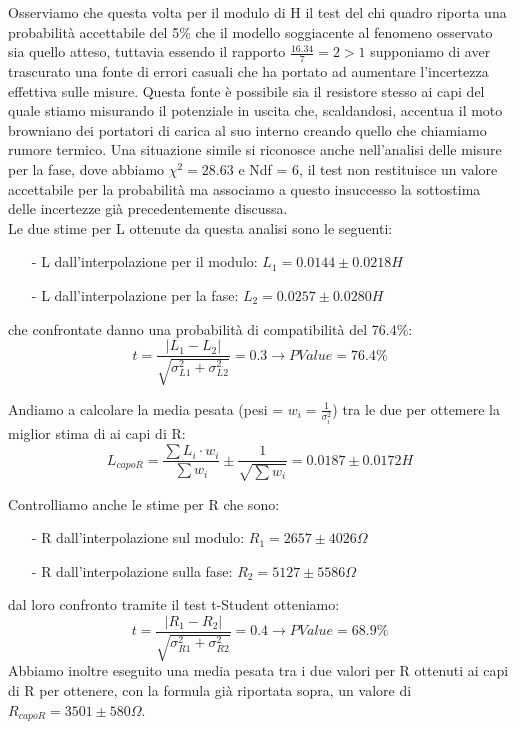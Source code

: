 \documentclass{article}
\theoremstyle{definition}
\begin{document}
\noindent Osserviamo che questa volta per il modulo di H il test del chi quadro riporta una probabilità accettabile del 5\% che il modello soggiacente al fenomeno osservato sia quello atteso, tuttavia essendo il rapporto \(\frac{16.34}{7} = 2 > 1\) supponiamo di aver trascurato una fonte di errori casuali che ha portato ad aumentare l'incertezza effettiva sulle misure. Questa fonte è possibile sia il resistore stesso ai capi del quale stiamo misurando il potenziale in uscita che, scaldandosi, accentua il moto browniano dei portatori di carica al suo interno creando quello che chiamiamo rumore termico. Una situazione simile si riconosce anche nell'analisi delle misure per la fase, dove abbiamo \(\chi^{2} =28.63 \) e Ndf = 6, il test non restituisce un valore accettabile per la probabilità ma associamo a questo insuccesso la sottostima delle incertezze già precedentemente discussa. \\

\noindent Le due stime per L ottenute da questa analisi sono le seguenti:
\begin{enumerate}
    \item[-] L dall'interpolazione per il modulo: \(L_{1} = 0.0144 \pm 0.0218 H\)
    \item[-] L dall'interpolazione per la fase: \(L_{2} = 0.0257 \pm 0.0280 H\)
\end{enumerate}
\noindent che confrontate danno una probabilità di compatibilità del 76.4\%:
\[t = \frac{\left| L_{1} - L_{2}\right|}{\sqrt{\sigma^{2}_{L1} + \sigma^{2}_{L2}}} = 0.3 \rightarrow PValue = 76.4\%\]

\noindent Andiamo a calcolare la media pesata (pesi = \(w_{i} = \frac{1}{\sigma^{2}_{i}}\)) tra le due per ottemere la miglior stima di ai capi di R: 
\[L_{capoR} = \frac{\sum{L_{i} \cdot w_{i}}}{\sum{w_{i}}}\pm \frac{1}{\sqrt{\sum{w_{i}}}} = 0.0187 \pm 0.0172 H\]

\noindent Controlliamo anche le stime per R che sono:
\begin{enumerate}
    \item[-] R dall'interpolazione sul modulo: \(R_{1} = 2657 \pm 4026 \Omega \)
    \item[-] R dall'interpolazione sulla fase: \(R_{2} = 5127 \pm 5586 \Omega\)
\end{enumerate}

\noindent dal loro confronto tramite il test t-Student otteniamo:
\[t = \frac{\left| R_{1} - R_{2}\right|}{\sqrt{\sigma^{2}_{R1} + \sigma^{2}_{R2}}} = 0.4 \rightarrow PValue = 68.9\%\]
\noindent Abbiamo inoltre eseguito una media pesata tra i due valori per R ottenuti ai capi di R per ottenere, con la formula già riportata sopra, un valore di \(R_{capoR} =  3501 \pm 580 \Omega\).
\end{document}
